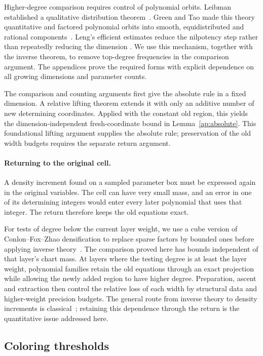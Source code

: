 Higher-degree comparison requires control of polynomial
orbits. Leibman established a qualitative distribution
theorem~\cite{Leibman2005}. Green and Tao made this theory
quantitative and factored polynomial orbits into smooth,
equidistributed and rational components~\cite{GreenTaoOrbits2012}.
Leng's efficient estimates reduce the nilpotency step rather
than repeatedly reducing the dimension
\cite{LengEquidistribution2023}.
We use this mechanism, together with the inverse theorem,
to remove top-degree frequencies in the comparison argument.
The appendices prove the required forms with explicit dependence
on all growing dimensions and parameter counts.

The comparison and counting arguments first give the absolute
rule in a fixed dimension. A relative lifting theorem extends
it with only an additive number of new determining coordinates.
Applied with the constant old region, this yields the
dimension-independent fresh-coordinate bound in
Lemma~\ref{ap:absolute}. This foundational lifting argument
supplies the absolute rule; preservation of the old width
budgets requires the separate return argument.

\paragraph{Returning to the original cell.}
A density increment found on a sampled parameter box must be
expressed again in the original variables. The cell can have very
small mass, and an error in one of its determining integers
would enter every later polynomial that uses that integer.
The return therefore keeps the old equations exact.

For tests of degree below the current layer weight, we use a
cube version of Conlon--Fox--Zhao densification to replace sparse
factors by bounded ones before applying inverse
theory~\cite{ConlonFoxZhao2015}. The comparison proved here has
bounds independent of that layer's chart mass.
At layers where the testing degree is at least the layer weight,
polynomial families retain the old
equations through an exact projection while allowing the newly
added region to have higher degree. Preparation, ascent and
extraction then control the relative loss of each width by
structural data and higher-weight precision budgets.
The general route from inverse theory to density increments
is classical~\cite{GreenTaoDensity2010}; retaining this dependence
through the return is the quantitative issue addressed here.

\subsection{Coloring thresholds}

